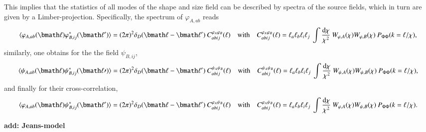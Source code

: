 \documentclass[a4paper,fleqn,usenatbib]{mnras}
\def\spirou#1{{\bf #1}}
\newcommand{\bra}{\langle}
\newcommand{\ket}{\rangle}
\newcommand{\dd}{\mathrm{d}}
\newcommand{\dirac}{\delta_D}
\begin{document}
This implies that the statistics of all modes of the shape and size field can be described by spectra of the source fields, which in turn are given by a Limber-projection. Specifically, the spectrum of $\varphi_{A,ab}$ reads
\begin{equation}
\bra\varphi_{A,ab}(\bmath\ell)\varphi_{B,ij}^*(\bmath\ell^\prime)\ket = 
(2\pi)^2\dirac(\bmath\ell-\bmath\ell^\prime)\:C^{\varphi_A\varphi_B}_{abij}(\ell)
\quad\mathrm{with}\quad
C^{\varphi_A\varphi_B}_{abij}(\ell) = 
\ell_a\ell_b\ell_i\ell_j\:\int\frac{\dd\chi}{\chi^2}\:W_{\varphi,A}(\chi)W_{\varphi,B}(\chi)\:P_{\Phi\Phi}(k = \ell/\chi),
\end{equation}
similarly, one obtains for the the field $\psi_{B,ij}$,
\begin{equation}
\bra\psi_{A,ab}(\bmath\ell)\psi_{B,ij}^*(\bmath\ell\prime)\ket = 
(2\pi)^2\dirac(\bmath\ell-\bmath\ell^\prime)\:C^{\psi_A\psi_B}_{abij}(\ell)
\quad\mathrm{with}\quad
C^{\psi_A\psi_B}_{abij}(\ell) = 
\ell_a\ell_b\ell_i\ell_j\:\int\frac{\dd\chi}{\chi^2}\:W_{\psi,A}(\chi)W_{\psi,B}(\chi)\:P_{\Phi\Phi}(k = \ell/\chi),
\end{equation}
and finally for their cross-correlation,
\begin{equation}
\bra\varphi_{A,ab}(\bmath\ell)\psi_{B,ij}^*(\bmath\ell^\prime)\ket =
(2\pi)^2\dirac(\bmath\ell-\bmath\ell^\prime)\:C^{\varphi_A\psi_B}_{abij}(\ell)
\quad\mathrm{with}\quad
C^{\varphi_A\psi_B}_{abij}(\ell) =
\ell_a\ell_b\ell_i\ell_j\:\int\frac{\dd\chi}{\chi^2}\:W_{\varphi,A}(\chi)W_{\psi,B}(\chi)\:P_{\Phi\Phi}(k = \ell/\chi).
\end{equation}


\spirou{add: Jeans-model}


\end{document}

